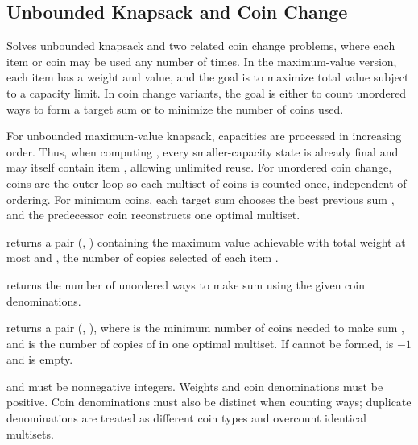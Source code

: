 \subsection{Unbounded Knapsack and Coin Change}
\label{sec:1.3.4}
Solves unbounded knapsack and two related coin change problems, where each item or coin may be used any number of times. In the maximum-value version, each item has a weight and value, and the goal is to maximize total value subject to a capacity limit. In coin change variants, the goal is either to count unordered ways to form a target sum or to minimize the number of coins used.

For unbounded maximum-value knapsack, capacities are processed in increasing order. Thus, when computing , every smaller-capacity state  is already final and may itself contain item , allowing unlimited reuse. For unordered coin change, coins are the outer loop so each multiset of coins is counted once, independent of ordering. For minimum coins, each target sum chooses the best previous sum , and the predecessor coin reconstructs one optimal multiset.

\begin{compactitem}
  \item {} returns a pair (, ) containing the maximum value achievable with total weight at most  and , the number of copies selected of each item .
  \item {} returns the number of unordered ways to make sum  using the given coin denominations.
  \item {} returns a pair (, ), where  is the minimum number of coins needed to make sum , and  is the number of copies of  in one optimal multiset. If  cannot be formed,  is $-1$ and  is empty.
\end{compactitem}

 and  must be nonnegative integers. Weights and coin denominations must be positive. Coin denominations must also be distinct when counting ways; duplicate denominations are treated as different coin types and overcount identical multisets.

